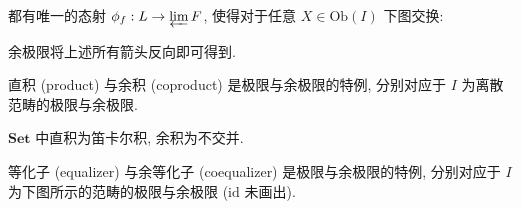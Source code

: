 都有唯一的态射 \(\phi_f : L \to \varprojlim F\), 使得对于任意 \(X \in \mathrm{Ob} (I)\) 下图交换:

\begin{center}
\end{center}

余极限将上述所有箭头反向即可得到.

\begin{definition}
    直积 (product) 与余积 (coproduct) 是极限与余极限的特例, 分别对应于 \(I\) 为离散范畴的极限与余极限.
\end{definition}

\begin{example}
    \(\mathbf{Set}\) 中直积为笛卡尔积, 余积为不交并.
\end{example}

\begin{definition}
    等化子 (equalizer) 与余等化子 (coequalizer) 是极限与余极限的特例, 分别对应于 \(I\) 为下图所示的范畴的极限与余极限 (\(\mathrm{id}\) 未画出).

    \begin{center}
    \end{center}
\end{definition}

